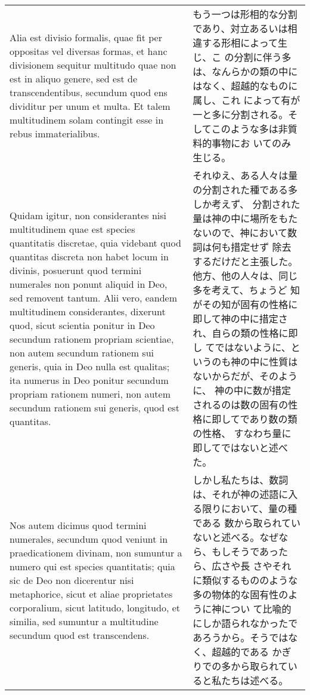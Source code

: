 \documentclass[10pt]{jsarticle} %
\begin{document}
\begin{longtable}{p{21em}p{21em}}
\\

Alia est divisio formalis, quae fit per oppositas vel
diversas formas, et hanc divisionem sequitur multitudo quae non est in
aliquo genere, sed est de transcendentibus, secundum quod ens
dividitur per unum et multa. 
Et talem multitudinem solam contingit
esse in rebus immaterialibus. 


&

もう一つは形相的な分割であり、対立あるいは相違する形相によって生じ、こ
 の分割に伴う多は、なんらかの類の中にはなく、超越的なものに属し、これ
 によって有が一と多に分割される。そしてこのような多は非質料的事物にお
 いてのみ生じる。


\\


Quidam igitur, non considerantes nisi
multitudinem quae est species quantitatis discretae, quia videbant
quod quantitas discreta non habet locum in divinis, posuerunt quod
termini numerales non ponunt aliquid in Deo, sed removent tantum. Alii
vero, eandem multitudinem considerantes, dixerunt quod, sicut scientia
ponitur in Deo secundum rationem propriam scientiae, non autem
secundum rationem sui generis, quia in Deo nulla est qualitas; ita
numerus in Deo ponitur secundum propriam rationem numeri, non autem
secundum rationem sui generis, quod est quantitas. 


&

それゆえ、ある人々は量の分割された種である多しか考えず、
分割された量は神の中に場所をもたないので、神において数詞は何も措定せず
 除去するだけだと主張した。他方、他の人々は、同じ多を考えて、ちょうど
 知がその知が固有の性格に即して神の中に措定され、自らの類の性格に即し
 てではないように、というのも神の中に性質はないからだが、そのように、
 神の中に数が措定されるのは数の固有の性格に即してであり数の類の性格、
 すなわち量に即してではないと述べた。

\\

Nos autem dicimus
quod termini numerales, secundum quod veniunt in praedicationem
divinam, non sumuntur a numero qui est species quantitatis; quia sic
de Deo non dicerentur nisi metaphorice, sicut et aliae proprietates
corporalium, sicut latitudo, longitudo, et similia, sed sumuntur a
multitudine secundum quod est transcendens. 


&

しかし私たちは、数詞は、それが神の述語に入る限りにおいて、量の種である
 数から取られていないと述べる。なぜなら、もしそうであったら、広さや長
 さやそれに類似するもののような多の物体的な固有性のように神につい
 て比喩的にしか語られなかったであろうから。そうではなく、超越的である
 かぎりでの多から取られていると私たちは述べる。



\end{longtable}
\end{document}

